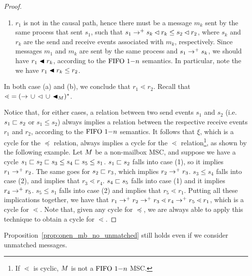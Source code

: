 \begin{proof}
\begin{enumerate}
\begin{enumerate}
		\item $r_1$ is not in the causal path, hence there must be a message $m_k$ sent by the same process that sent $s_1$, such that $s_1 \to^+ s_k \lhd r_k \le s_2 \lhd r_2$, where $s_k$ and $r_k$ are the send and receive events associated with $m_k$, respectively. Since messages $m_1$ and $m_k$ are sent by the same process and $s_1 \to^+ s_k$, we should have $r_1 \blacktriangleleft r_k$, according to the $\text{FIFO } 1\mathsf{-}n$ semantics. In particular, note the we have $r_1 \blacktriangleleft r_k \le r_2$.
	\end{enumerate}
	In both case (a) and (b), we conclude that $r_1 \lessdot r_2$. Recall that ${\lessdot} = ({\to} \,\cup\, {\lhd} \,\cup\, {\blacktriangleleft_M})^\ast$.
\end{enumerate}
Notice that, for either cases, a relation between two send events $s_1$ and $s_2$ (i.e. $s_1 \sqsubset s_2$ or $s_1 \le s_2$) always implies a relation between the respective receive events $r_1$ and $r_2$, according to the $\text{FIFO } 1\mathsf{-}n$ semantics. It follows that $\xi$, which is a cycle for the $\preceq$ relation, always implies a cycle for the $\lessdot$ relation\footnote{If $\lessdot$ is cyclic, $M$ is not a $\text{FIFO } 1\mathsf{-}n$ MSC.}, as shown by the following example. Let $M$ be a non-mailbox MSC, and suppose we have a cycle $s_1 \sqsubset s_2 \sqsubset s_3 \le s_4 \sqsubset s_5 \le s_1$. $s_1 \sqsubset s_2$ falls into case (1), so it implies $r_1 \to^+ r_2$. The same goes for $s_2 \sqsubset r_3$, which implies $r_2 \to^+ r_3$. $s_3 \le s_4$ falls into case (2), and implies that $r_3 \lessdot r_4$. $s_4 \sqsubset s_5$ falls into case (1) and it implies $r_4 \to^+ r_5$. $s_5 \le s_1$ falls into case (2) and implies that $r_5 \lessdot r_1$. Putting all these implications together, we have that $r_1 \to^+ r_2 \to^+ r_3 \lessdot r_4 \to^+ r_5 \lessdot r_1$, which is a cycle for $\lessdot$. Note that, given any cycle for $\preceq$, we are always able to apply this technique to obtain a cycle for $\lessdot$.
\end{proof}


Proposition~\ref{prop:onen_mb_no_unmatched} still holds even if we consider unmatched messages.

